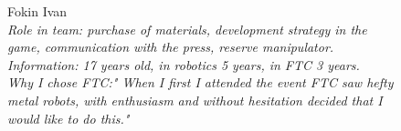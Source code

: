 \begin{figure}[H]
\begin{minipage}{0.47\linewidth}
	\end{minipage}
	\hfill
	\begin{minipage}{0.47\linewidth}
		Fokin Ivan\\
		\emph{Role in team: purchase of materials,  development strategy in the game,  communication with the press, reserve  manipulator.\\ }
		\emph{Information: 17 years old, in robotics 5 years, in FTC 3 years. \\ } 
		\emph{Why I chose FTC:" When I first I attended the event FTC saw hefty metal robots, with enthusiasm and without hesitation decided that I would like to do this."}		
	\end{minipage}	
\end{figure}

\fillpage


